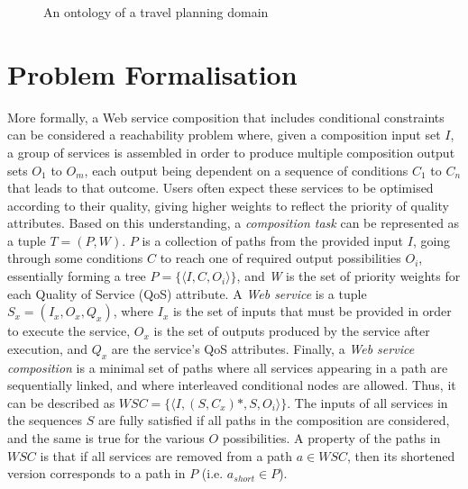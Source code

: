 \begin{figure}[h]
\centering
{}
 \caption{ An ontology of a travel planning domain}
 \label{taxonomy}
\end{figure}



\section{Problem Formalisation}

More formally, a Web service composition that includes conditional constraints can be considered a reachability problem where, given a composition input set $I$, a group of services is assembled in order to produce multiple composition output sets $O_1$ to $O_m$, each output being dependent on a sequence of conditions $C_1$ to $C_n$ that leads to that outcome. Users often expect these services to be optimised according to their quality, giving higher weights to reflect the priority of quality attributes. Based on this understanding, a \textit{composition task} can be represented as a tuple $T = (P, W)$. $P$ is a collection of paths from the provided input $I$, going through some conditions $C$ to reach one of required output possibilities $O_i$, essentially forming a tree $P = \{\langle I,C,O_i\rangle\}$, and \textit{W} is the set of priority weights for each Quality of Service (QoS) attribute. A \textit{Web service} is a tuple $S_x = (I_x, O_x, Q_x)$, where $I_x$ is the set of inputs that must be provided in order to execute the service, $O_x$ is the set of outputs produced by the service after execution, and $Q_x$ are the service's QoS attributes. Finally, a \textit{Web service composition} is a minimal set of paths where all services appearing in a path are sequentially linked, and where interleaved conditional nodes are allowed. Thus, it can be described as $WSC = \{\langle I,(S,C_x)*,S,O_i\rangle\}$. The inputs of all services in the sequences $S$ are fully satisfied if all paths in the composition are considered, and the same is true for the various $O$ possibilities. A property of the paths in $WSC$ is that if all services are removed from a path $a \in WSC$, then its shortened version corresponds to a path in $P$ (i.e. $a_{short} \in P$).

